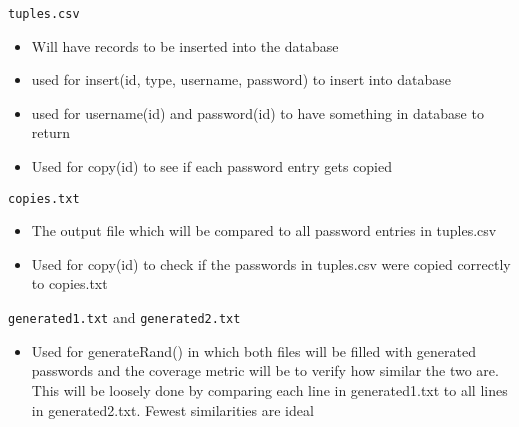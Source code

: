 \documentclass[12pt, titlepage]{article}
\begin{document}
\texttt{tuples.csv}
\begin{itemize}
    \item Will have records to be inserted into the database
    \item used for insert(id, type, username, password) to insert into database
    \item used for username(id) and password(id) to have something in database to return
    \item Used for copy(id) to see if each password entry gets copied
\end{itemize}

\texttt{copies.txt}
\begin{itemize}
    \item The output file which will be compared to all password entries in tuples.csv
    \item Used for copy(id) to check if the passwords in tuples.csv were copied correctly to copies.txt
\end{itemize}

\texttt{generated1.txt} and \texttt{generated2.txt}
\begin{itemize}
    \item Used for generateRand() in which both files will be filled with generated passwords and the coverage metric will be to verify how similar the two are. This will be loosely done by comparing each line in generated1.txt to all lines in generated2.txt. Fewest similarities are ideal 
\end{itemize}





\newpage
\end{document}
